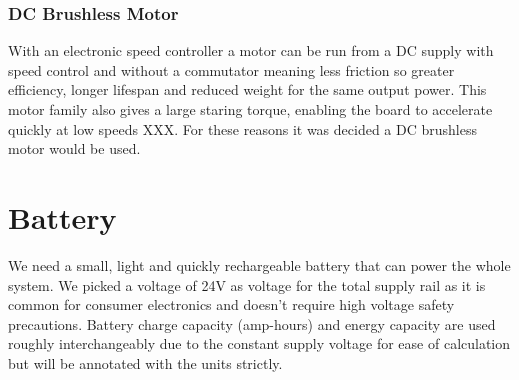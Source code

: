 \documentclass[journal,10pt]{IEEEtran}
\begin{document}
        \subsubsection{DC Brushless Motor}
            With an electronic speed controller a motor can be run from a DC supply with speed control and without a commutator meaning less friction so greater efficiency, longer lifespan and reduced weight for the same output power. This motor family also gives a large staring torque, enabling the board to accelerate quickly at low speeds XXX. For these reasons it was decided a DC brushless motor would be used.
    \section{Battery}
    We need a small, light and quickly rechargeable battery that can power the whole system. We picked a voltage of 24V as voltage for the total supply rail as it is common for consumer electronics and doesn't require high voltage safety precautions. Battery charge capacity (amp-hours) and energy capacity are used roughly interchangeably due to the constant supply voltage for ease of calculation but will be annotated with the units strictly.
\end{document}
